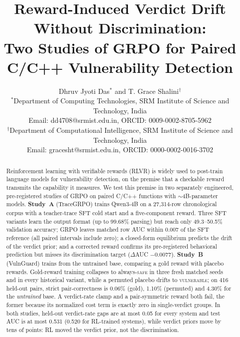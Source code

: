 \documentclass[journal]{IEEEtran}
\newcommand{\vuln}{\textsc{vulnerable}}
\newcommand{\safe}{\textsc{safe}}
\begin{document}
\title{Reward-Induced Verdict Drift\\
Without Discrimination:\\
Two Studies of GRPO for Paired\\
C/C++ Vulnerability Detection}

\author{Dhruv Jyoti Das$^{*}$ and T. Grace Shalini$^{\dagger}$\\
$^{*}$Department of Computing Technologies, SRM Institute of Science and Technology, India\\
Email: dd4708@srmist.edu.in, ORCID: 0009-0002-8705-5962\\
$^{\dagger}$Department of Computational Intelligence, SRM Institute of Science and Technology, India\\
Email: gracesht@srmist.edu.in, ORCID: 0000-0002-0016-3702}

\maketitle

\begin{abstract}
Reinforcement learning with verifiable rewards (RLVR) is widely used to post-train language models for vulnerability detection, on the premise that a checkable reward transmits the capability it measures. We test this premise in two separately engineered, pre-registered studies of GRPO on paired C/C++ functions with $\sim$4B-parameter models.
\textbf{Study~A} (TraceGRPO) trains Qwen3-4B on a 27,314-row chronological corpus with a teacher-trace SFT cold start and a five-component reward. Three SFT variants learn the output format (up to 99.68\% parsing) but reach only 49.3--50.5\% validation accuracy; GRPO leaves matched row AUC within 0.007 of the SFT reference (all paired intervals include zero); a closed-form equilibrium predicts the drift of the verdict prior; and a corrected reward confirms its pre-registered behavioral prediction but misses its discrimination target ($\Delta$AUC $-0.0077$).
\textbf{Study~B} (VulnGuard) trains from the untrained base, comparing a gold reward with placebo rewards. Gold-reward training collapses to always-\safe{} in three fresh matched seeds and in every historical variant, while a permuted placebo drifts to \vuln{}; on 416 held-out pairs, strict pair-correctness is 0.06\% (gold), 1.10\% (permuted) and 4.30\% for the \emph{untrained} base. A verdict-rate clamp and a pair-symmetric reward both fail, the former because its normalized cost term is exactly zero in single-verdict groups.
In both studies, held-out verdict-rate gaps are at most 0.05 for every system and test AUC is at most 0.531 (0.520 for RL-trained systems), while verdict priors move by tens of points: RL moved the verdict prior, not the discrimination.
\end{abstract}
\end{document}
